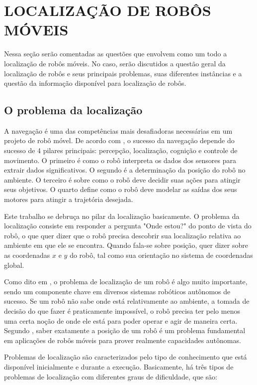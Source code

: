 \documentclass[acronym, symbols, table]{fei}
\begin{document}
	\chapter{LOCALIZAÇÃO DE ROBÔS MÓVEIS}\label{sec:chapter_localizacao_robos_moveis}
	
		Nessa seção serão comentadas as questões que envolvem como um todo a localização de robôs móveis. No caso, serão discutidos a questão geral da localização de robôs e seus principais problemas, suas diferentes instâncias e a questão da informação disponível para localização de robôs.
		
		\section{O problema da localização}
		
			A navegação é uma das competências mais desafiadoras necessárias em um projeto de robô móvel. De acordo com \textcite{siegwart2011introduction}, o sucesso da navegação depende do sucesso de 4 pilares principais: percepção, localização, cognição e controle de movimento. O primeiro é como o robô interpreta os dados dos sensores para extrair dados significativos. O segundo é a determinação da posição do robô no ambiente. O terceiro é sobre como o robô deve decidir suas ações para atingir seus objetivos. O quarto define como o robô deve modelar as saídas dos seus motores para atingir a trajetória desejada.
			
			Este trabalho se debruça no pilar da localização basicamente. O problema da localização consiste em responder a pergunta "Onde estou?" do ponto de vista do robô, o que quer dizer que o robô precisa descobrir sua localização relativa ao ambiente em que ele se encontra. Quando fala-se sobre posição, quer dizer sobre as coordenadas $x$ e $y$ do robô, tal como sua orientação no sistema de coordenadas global.
			
			Como dito em \textcite{thrun2001robust}, o problema de localização de um robô é algo muito importante, sendo um componente chave em diversos sistemas robóticos autônomos de sucesso. Se um robô não sabe onde está relativamente ao ambiente, a tomada de decisão do que fazer é praticamente impossível, o robô precisa ter pelo menos uma certa noção de onde ele está para poder operar e agir de maneira certa. Segundo \textcite{borenstein1997mobile}, saber exatamente a posição de um robô é um problema fundamental em aplicações de robôs móveis para prover realmente capacidades autônomas.
			
			Problemas de localização são caracterizados pelo tipo de conhecimento que está disponível inicialmente e durante a execução. Basicamente, há três tipos de problemas de localização com diferentes graus de dificuldade, que são:
			
\end{document}
